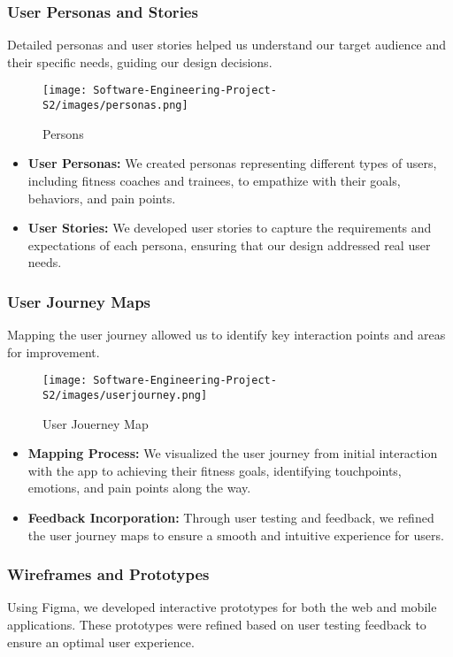 \subsubsection{User Personas and Stories}
Detailed personas and user stories helped us understand our target audience and their specific needs, guiding our design decisions.
\begin{figure}[H]
    \centering
    \texttt{[image: Software-Engineering-Project-S2/images/personas.png]}
    \caption{Persons}
    \label{fig:example_image}
  \end{figure}


\begin{itemize}
  \item \textbf{User Personas:} We created personas representing different types of users, including fitness coaches and trainees, to empathize with their goals, behaviors, and pain points.
  
  \item \textbf{User Stories:} We developed user stories to capture the requirements and expectations of each persona, ensuring that our design addressed real user needs.
\end{itemize}


\subsubsection{User Journey Maps}
Mapping the user journey allowed us to identify key interaction points and areas for improvement.

\begin{figure}[H]
    \centering
    \texttt{[image: Software-Engineering-Project-S2/images/userjourney.png]}
    \caption{User Jouerney Map}
    \label{fig:userjourney}
  \end{figure}


\begin{itemize}
  \item \textbf{Mapping Process:} We visualized the user journey from initial interaction with the app to achieving their fitness goals, identifying touchpoints, emotions, and pain points along the way.
  
  \item \textbf{Feedback Incorporation:} Through user testing and feedback, we refined the user journey maps to ensure a smooth and intuitive experience for users.
\end{itemize}

\subsubsection{Wireframes and Prototypes}
Using Figma, we developed interactive prototypes for both the web and mobile applications. These prototypes were refined based on user testing feedback to ensure an optimal user experience.

